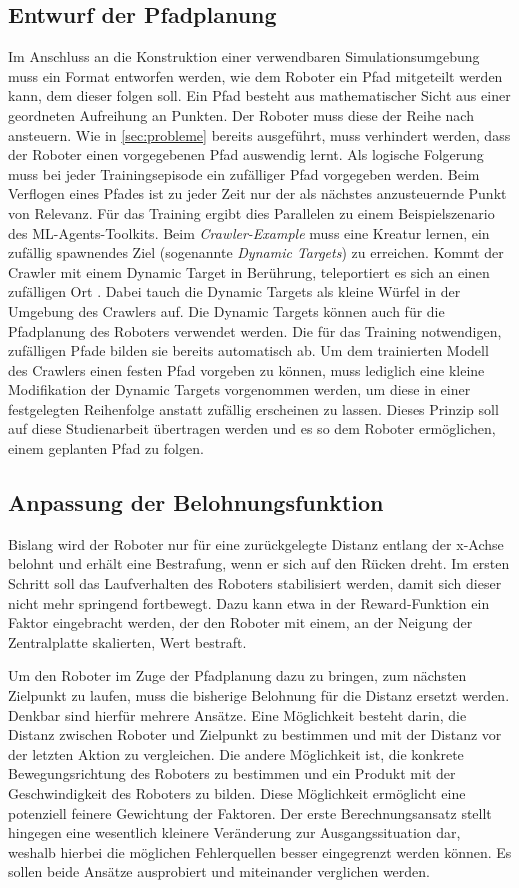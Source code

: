 \subsection{Entwurf der Pfadplanung}
Im Anschluss an die Konstruktion einer verwendbaren Simulationsumgebung muss ein Format entworfen werden, wie dem Roboter ein Pfad mitgeteilt werden kann, dem dieser folgen soll.
Ein Pfad besteht aus mathematischer Sicht aus einer geordneten Aufreihung an Punkten.
Der Roboter muss diese der Reihe nach ansteuern.
Wie in \autoref{sec:probleme} bereits ausgeführt, muss verhindert werden, dass der Roboter einen vorgegebenen Pfad auswendig lernt.
Als logische Folgerung muss bei jeder Trainingsepisode ein zufälliger Pfad vorgegeben werden.
Beim Verflogen eines Pfades ist zu jeder Zeit nur der als nächstes anzusteuernde Punkt von Relevanz.
Für das Training ergibt dies Parallelen zu einem Beispielszenario des ML-Agents-Toolkits.
Beim \emph{Crawler-Example} muss eine Kreatur lernen, ein zufällig spawnendes Ziel (sogenannte \emph{Dynamic Targets}) zu erreichen.
Kommt der Crawler mit einem Dynamic Target in Berührung, teleportiert es sich an einen zufälligen Ort \cite{crawlerExample}.
Dabei tauch die Dynamic Targets als kleine Würfel in der Umgebung des Crawlers auf.
Die Dynamic Targets können auch für die Pfadplanung des Roboters verwendet werden.
Die für das Training notwendigen, zufälligen Pfade bilden sie bereits automatisch ab.
Um dem trainierten Modell des Crawlers einen festen Pfad vorgeben zu können, muss lediglich eine kleine Modifikation der Dynamic Targets vorgenommen werden, um diese in einer festgelegten Reihenfolge anstatt zufällig erscheinen zu lassen.
Dieses Prinzip soll auf diese Studienarbeit übertragen werden und es so dem Roboter ermöglichen, einem geplanten Pfad zu folgen.

\subsection{Anpassung der Belohnungsfunktion}
Bislang wird der Roboter nur für eine zurückgelegte Distanz entlang der x-Achse belohnt und erhält eine Bestrafung, wenn er sich auf den Rücken dreht.
Im ersten Schritt soll das Laufverhalten des Roboters stabilisiert werden, damit sich dieser nicht mehr springend fortbewegt.
Dazu kann etwa in der Reward-Funktion ein Faktor eingebracht werden, der den Roboter mit einem, an der Neigung der Zentralplatte skalierten, Wert bestraft.

Um den Roboter im Zuge der Pfadplanung dazu zu bringen, zum nächsten Zielpunkt zu laufen, muss die bisherige Belohnung für die Distanz ersetzt werden.
Denkbar sind hierfür mehrere Ansätze.
Eine Möglichkeit besteht darin, die Distanz zwischen Roboter und Zielpunkt zu bestimmen und mit der Distanz vor der letzten Aktion zu vergleichen.
Die andere Möglichkeit ist, die konkrete Bewegungsrichtung des Roboters zu bestimmen und ein Produkt mit der Geschwindigkeit des Roboters zu bilden.
Diese Möglichkeit ermöglicht eine potenziell feinere Gewichtung der Faktoren.
Der erste Berechnungsansatz stellt hingegen eine wesentlich kleinere Veränderung zur Ausgangssituation dar, weshalb hierbei die möglichen Fehlerquellen besser eingegrenzt werden können.
Es sollen beide Ansätze ausprobiert und miteinander verglichen werden.

